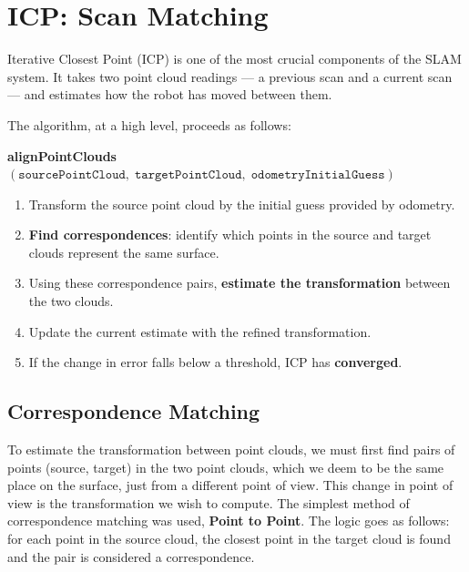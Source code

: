 \documentclass[12pt]{report}
\begin{document}
\chapter{ICP: Scan Matching}
\label{chap:icp}

Iterative Closest Point (ICP) is one of the most crucial components of the SLAM system.
It takes two point cloud readings --- a previous scan and a current scan --- and estimates how the
robot has moved between them.

The algorithm, at a high level, proceeds as follows: \newline

\noindent\textbf{alignPointClouds}$\left(\texttt{sourcePointCloud},\; \texttt{targetPointCloud},\; \texttt{odometryInitialGuess}\right)$
\begin{enumerate}
    \item Transform the source point cloud by the initial guess provided by odometry.
    \item \textbf{Find correspondences}: identify which points in the source and target clouds
          represent the same surface.
    \item Using these correspondence pairs, \textbf{estimate the transformation} between the two
          clouds.
    \item Update the current estimate with the refined transformation.
    \item If the change in error falls below a threshold, ICP has \textbf{converged}.
\end{enumerate}

\section{Correspondence Matching}
To estimate the transformation between point clouds, we must first find pairs of points (source, target) in the two 
point clouds, which we deem to be the same place on the surface, just from a different point of view.
This change in point of view is the transformation we wish to compute.
\newline
The simplest method of correspondence matching was used, \textbf{Point to Point}.
\newline
The logic goes as follows: 
\newline for each point in the source cloud, the closest
point in the target cloud is found and the pair is considered a correspondence.
\end{document}
